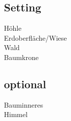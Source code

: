 \subsection{Setting}
\begin{description}
\item [Höhle]
\item [Erdoberfläche/Wiese]
\item [Wald]
\item [Baumkrone]
\end{description}

\subsection{optional}
\begin{description}
\item [Bauminneres]
\item [Himmel]
\end{description}
\newpage



